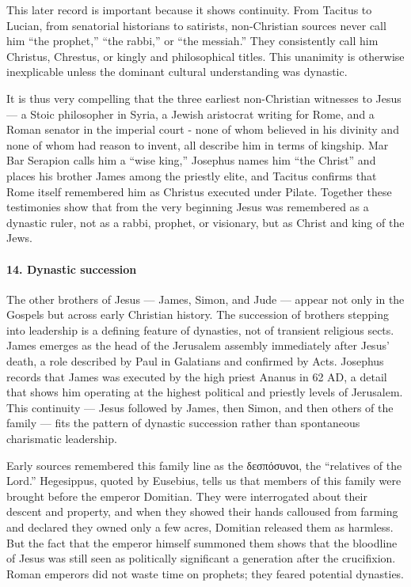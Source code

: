 This later record is important because it shows continuity.
From Tacitus to Lucian, from senatorial historians to satirists, non-Christian sources never call him “the prophet,” “the rabbi,” or “the messiah.”
They consistently call him Christus, Chrestus, or kingly and philosophical titles.
This unanimity is otherwise inexplicable unless the dominant cultural understanding was dynastic.

It is thus very compelling that the three earliest non-Christian witnesses to Jesus — a Stoic philosopher in Syria, a Jewish aristocrat writing for Rome, and a Roman senator in the imperial court - none of whom believed in his divinity and none of whom had reason to invent, all describe him in terms of kingship.
Mar Bar Serapion calls him a “wise king,” Josephus names him “the Christ” and places his brother James among the priestly elite, and Tacitus confirms that Rome itself remembered him as Christus executed under Pilate.
Together these testimonies show that from the very beginning Jesus was remembered as a dynastic ruler, not as a rabbi, prophet, or visionary, but as Christ and king of the Jews.

\paragraph{14.
Dynastic succession}\label{par:dynastic-succession}

The other brothers of Jesus — James, Simon, and Jude — appear not only in the Gospels but across early Christian history.
The succession of brothers stepping into leadership is a defining feature of dynasties, not of transient religious sects.
James emerges as the head of the Jerusalem assembly immediately after Jesus’ death, a role described by Paul in Galatians and confirmed by Acts.
Josephus records that James was executed by the high priest Ananus in 62 AD, a detail that shows him operating at the highest political and priestly levels of Jerusalem.
This continuity — Jesus followed by James, then Simon, and then others of the family — fits the pattern of dynastic succession rather than spontaneous charismatic leadership.

Early sources remembered this family line as the δεσπόσυνοι, the “relatives of the Lord.”
Hegesippus, quoted by Eusebius, tells us that members of this family were brought before the emperor Domitian.
They were interrogated about their descent and property, and when they showed their hands calloused from farming and declared they owned only a few acres, Domitian released them as harmless.
But the fact that the emperor himself summoned them shows that the bloodline of Jesus was still seen as politically significant a generation after the crucifixion.
Roman emperors did not waste time on prophets; they feared potential dynasties.

